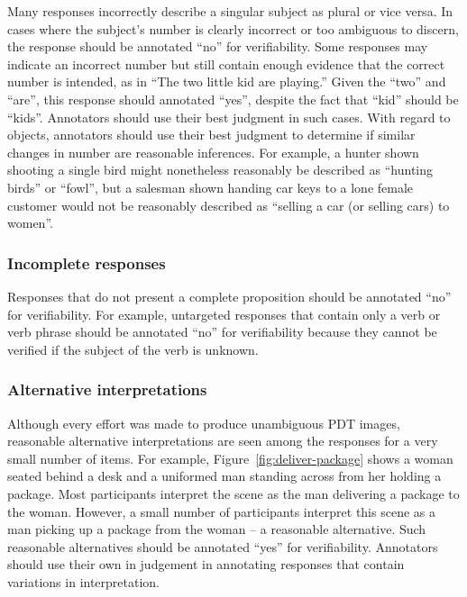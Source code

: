\documentclass[12pt,notitlepage]{article}
\begin{document}
Many responses incorrectly describe a singular subject as plural or vice versa. In cases where the subject's number is clearly incorrect or too ambiguous to discern, the response should be annotated ``no'' for verifiability. Some responses may indicate an incorrect number but still contain enough evidence that the correct number is intended, as in ``The two little kid are playing.'' Given the ``two'' and ``are'', this response should annotated ``yes'', despite the fact that ``kid'' should be ``kids''. Annotators should use their best judgment in such cases. With regard to objects, annotators should use their best judgment to determine if similar changes in number are reasonable inferences. For example, a hunter shown shooting a single bird might nonetheless reasonably be described as ``hunting birds'' or ``fowl'', but a salesman shown handing car keys to a lone female customer would not be reasonably described as ``selling a car (or selling cars) to women''.

\subsubsection{Incomplete responses} Responses that do not present a complete proposition should be annotated ``no'' for verifiability. For example, untargeted responses that contain only a verb or verb phrase should be annotated ``no'' for verifiability because they cannot be verified if the subject of the verb is unknown.

\subsubsection{Alternative interpretations} Although every effort was made to produce unambiguous PDT images, reasonable alternative interpretations are seen among the responses for a very small number of items. For example, Figure~\ref{fig:deliver-package} shows a woman seated behind a desk and a uniformed man standing across from her holding a package. Most participants interpret the scene as the man delivering a package to the woman. However, a small number of participants interpret this scene as a man picking up a package from the woman -- a reasonable alternative. Such reasonable alternatives should be annotated ``yes'' for verifiability. Annotators should use their own in judgement in annotating responses that contain variations in interpretation.
\end{document}

